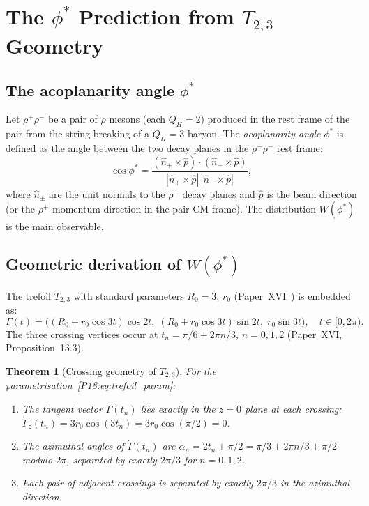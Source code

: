 \documentclass[11pt,a4paper]{article}
\newtheorem{theorem}{Theorem}[section]
\theoremstyle{definition}\newtheorem{definition}[theorem]{Definition}
\theoremstyle{remark}
\newcommand{\QH}{Q_H}
\newcommand{\phistar}{\phi^*}
\begin{document}
\section{The $\phistar$ Prediction from $T_{2,3}$ Geometry}
\label{P18:sec:phi_star}

\subsection{The acoplanarity angle $\phistar$}
\label{P18:sec:phi_star_def}

Let $\rho^+\rho^-$ be a pair of $\rho$ mesons (each $\QH=2$)
produced in the rest frame of the pair from the string-breaking of
a $\QH=3$ baryon.  The \emph{acoplanarity angle} $\phistar$ is
defined as the angle between the two decay planes in the $\rho^+\rho^-$
rest frame:
\begin{equation}
  \cos\phistar = \frac{(\hat{n}_+\times\hat{p})\cdot
                       (\hat{n}_-\times\hat{p})}
                      {|\hat{n}_+\times\hat{p}|\,|\hat{n}_-\times\hat{p}|},
  \label{P18:eq:phi_star_def}
\end{equation}
where $\hat{n}_\pm$ are the unit normals to the $\rho^\pm$ decay
planes and $\hat{p}$ is the beam direction (or the $\rho^+$
momentum direction in the pair CM frame).  The distribution
$W(\phistar)$ is the main observable.

\subsection{Geometric derivation of $W(\phistar)$}
\label{P18:sec:phi_star_geom}

The trefoil $T_{2,3}$ with standard parameters $R_0=3$, $r_0$
(Paper~XVI~\cite{Paper16}) is embedded as:
\begin{equation}
  \Gamma(t) = \bigl((R_0+r_0\cos 3t)\cos 2t,\;
               (R_0+r_0\cos 3t)\sin 2t,\;
               r_0\sin 3t\bigr), \quad t\in[0,2\pi).
  \label{P18:eq:trefoil_param}
\end{equation}
The three crossing vertices occur at
$t_n = \pi/6 + 2\pi n/3$, $n=0,1,2$ (Paper~XVI,
Proposition~13.3).%

\begin{theorem}[Crossing geometry of $T_{2,3}$]
\label{P18:thm:crossing_geometry}
For the parametrisation~\eqref{P18:eq:trefoil_param}:
\begin{enumerate}[noitemsep,label=(\roman*)]
\item The tangent vector $\dot\Gamma(t_n)$ lies exactly in the
  $z=0$ plane at each crossing: $\dot\Gamma_z(t_n)=3r_0\cos(3t_n)
  =3r_0\cos(\pi/2)=0$.
\item The azimuthal angles of $\dot\Gamma(t_n)$ are
  $\alpha_n = 2t_n+\pi/2 = \pi/3+2\pi n/3+\pi/2$ modulo $2\pi$,
  separated by exactly $2\pi/3$ for $n=0,1,2$.
\item Each pair of adjacent crossings is separated by exactly
  $2\pi/3$ in the azimuthal direction.
\end{enumerate}
\end{theorem}
\end{document}
